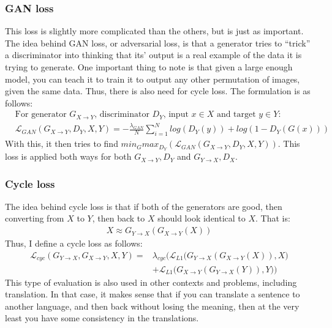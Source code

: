 \subsubsection{GAN loss}
This loss is slightly more complicated than the others, but is just as important. The idea behind GAN loss, or adversarial loss, is that a generator tries to ``trick'' a discriminator into thinking that its' output is a real example of the data it is trying to generate. One important thing to note is that given a large enough model, you can teach it to train it to output any other permutation of images, given the same data. Thus, there is also need for cycle loss. The formulation is as follows:
\begin{align}
  &\text{For generator $G_{X\rightarrow Y}$, discriminator $D_Y$, input $x \in X$ and target $y \in Y$:} \nonumber\\
  &\mathcal{L}_{GAN}(G_{X\rightarrow Y},D_Y,X,Y) = -\frac{\lambda_{GAN}}{N} \sum_{i=1}^N log(D_Y(y)) + log(1-D_Y(G(x)))
\end{align}
With this, it then tries to find $min_Gmax_{D_Y}\left(\mathcal{L}_{GAN}(G_{X\rightarrow Y},D_Y,X,Y)\right)$. This loss is applied both ways for both $G_{X\rightarrow Y}, D_Y$ and $G_{Y\rightarrow X}, D_X$.

\subsubsection{Cycle loss}
The idea behind cycle loss is that if both of the generators are good, then converting from $X$ to $Y$, then back to $X$ should look identical to $X$. That is:
\begin{align*}
  X \approx G_{Y\rightarrow X}(G_{X\rightarrow Y}(X))
\end{align*}
Thus, I define a cycle loss as follows:
\begin{align}
  \mathcal{L}_{cyc}(G_{Y\rightarrow X}, G_{X\rightarrow Y}, X, Y) =& \lambda_{cyc} \bigg(\mathcal{L}_{L1}\big( G_{Y\rightarrow X}(G_{X\rightarrow Y}(X)), X\big)\nonumber\\
  &+ \mathcal{L}_{L1}\big( G_{X\rightarrow Y}(G_{Y\rightarrow X}(Y)), Y\big)\bigg)\label{eq:cyclambda}
\end{align}
This type of evaluation is also used in other contexts and problems, including translation. In that case, it makes sense that if you can translate a sentence to another language, and then back without losing the meaning, then at the very least you have some consistency in the translations.
